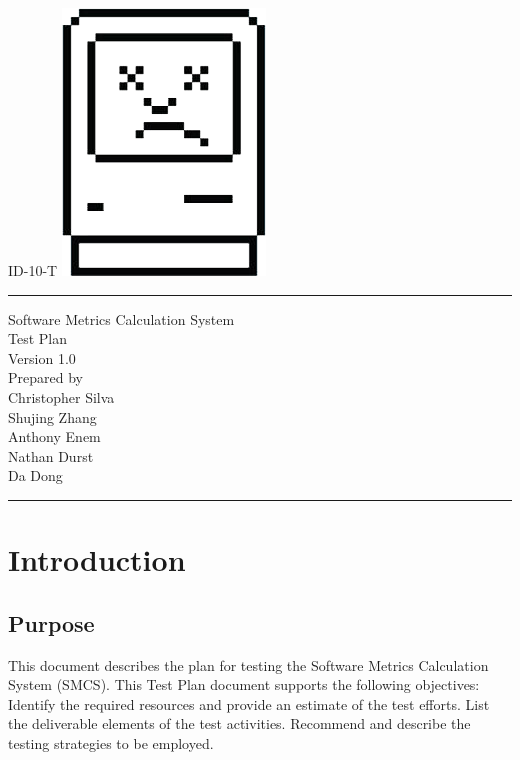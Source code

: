\documentclass{scrreprt}
\author{Christopher Silva}
\date{}
\def\myversion{1.0 }
\begin{document}
	\begin{titlepage}
		\flushright
		\LARGE{ID-10-T}
		\includegraphics[scale=0.08]{logo.png}
		\rule{16cm}{5pt}\vskip1cm
		\centering
		\Huge{Software Metrics Calculation System}\\
		\vspace{2cm}
		\Huge{Test Plan}\\
		\vspace{2cm}
		\LARGE{Version \myversion\\}
		\vspace{2cm}
		Prepared by\\
	    Christopher Silva\\
	    Shujing Zhang\\
		Anthony Enem\\
		Nathan Durst\\
		Da Dong\\
		\vfill
		\rule{16cm}{5pt}
	\end{titlepage}
	\tableofcontents
	{\let\clearpage\relax \chapter{Introduction}}
	
	\section{Purpose}
	This document describes the plan for testing the Software Metrics Calculation System (SMCS). This Test Plan document supports the following objectives:
	Identify the required resources and provide an estimate of the test efforts.
	List the deliverable elements of the test activities.
	Recommend and describe the testing strategies to be employed.
\end{document}
